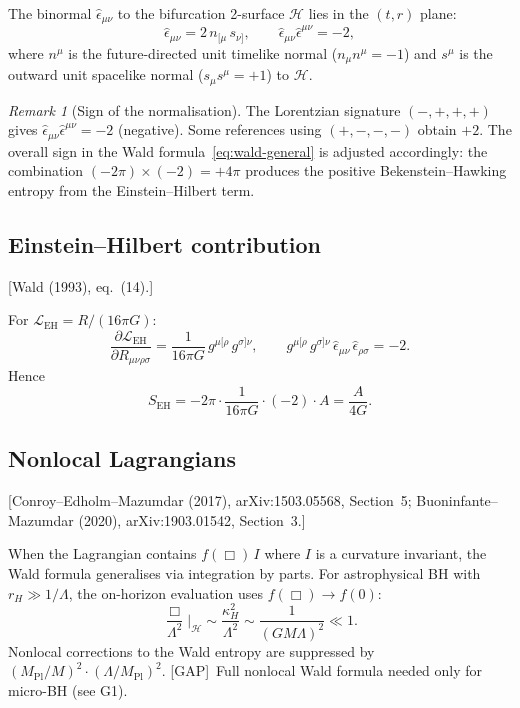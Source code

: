 \documentclass[12pt,a4paper]{article}
\theoremstyle{definition}
\theoremstyle{remark}
\newtheorem{remark}[proposition]{Remark}
\newcommand{\fromlit}[1]{\textcolor{blue!70!black}{\textsf{[#1]}}}
\newcommand{\gap}{\textcolor{red!80!black}{\textsf{[GAP]}}}
\begin{document}
The binormal $\hat{\epsilon}_{\mu\nu}$ to the bifurcation
2-surface $\mathcal{H}$ lies in the $(t,r)$ plane:
\begin{equation}\label{eq:binormal}
  \hat{\epsilon}_{\mu\nu} = 2\,n_{[\mu}\,s_{\nu]},
  \qquad
  \hat{\epsilon}_{\mu\nu}\hat{\epsilon}^{\mu\nu} = -2,
\end{equation}
where $n^\mu$ is the future-directed unit timelike normal
($n_\mu n^\mu = -1$) and $s^\mu$ is the outward unit spacelike
normal ($s_\mu s^\mu = +1$) to $\mathcal{H}$.

\begin{remark}[Sign of the normalisation]
The Lorentzian signature $(-,+,+,+)$ gives
$\hat{\epsilon}_{\mu\nu}\hat{\epsilon}^{\mu\nu} = -2$ (negative).
Some references using $(+,-,-,-)$ obtain $+2$.  The overall sign in
the Wald formula~\eqref{eq:wald-general} is adjusted accordingly:
the combination $(-2\pi)\times(-2) = +4\pi$ produces the positive
Bekenstein--Hawking entropy from the Einstein--Hilbert term.
\end{remark}

\subsection{Einstein--Hilbert contribution}
\fromlit{Wald (1993), eq.~(14).}

For $\mathcal{L}_{\mathrm{EH}} = R/(16\pi G)$:
\begin{equation}
  \frac{\partial\mathcal{L}_{\mathrm{EH}}}
  {\partial R_{\mu\nu\rho\sigma}}
  = \frac{1}{16\pi G}\,g^{\mu[\rho}\,g^{\sigma]\nu},
  \qquad
  g^{\mu[\rho}\,g^{\sigma]\nu}\,
  \hat{\epsilon}_{\mu\nu}\,\hat{\epsilon}_{\rho\sigma} = -2.
\end{equation}
Hence
\begin{equation}\label{eq:S-EH}
  S_{\mathrm{EH}} = -2\pi \cdot \frac{1}{16\pi G}
  \cdot (-2) \cdot A = \frac{A}{4G}.
\end{equation}

\subsection{Nonlocal Lagrangians}
\fromlit{Conroy--Edholm--Mazumdar (2017), arXiv:1503.05568, Section~5;
Buoninfante--Mazumdar (2020), arXiv:1903.01542, Section~3.}

When the Lagrangian contains $f(\Box)\,I$ where $I$ is a curvature
invariant, the Wald formula generalises via integration by parts.
For astrophysical BH with $r_H \gg 1/\Lambda$, the on-horizon
evaluation uses $f(\Box) \to f(0)$:
\begin{equation}
  \frac{\Box}{\Lambda^2}\bigg|_{\mathcal{H}} \sim
  \frac{\kappa_H^2}{\Lambda^2} \sim
  \frac{1}{(GM\Lambda)^2} \ll 1.
\end{equation}
Nonlocal corrections to the Wald entropy are suppressed by
$(M_{\mathrm{Pl}}/M)^2 \cdot (\Lambda/M_{\mathrm{Pl}})^2$.
\gap\ Full nonlocal Wald formula needed only for micro-BH (see G1).
\end{document}
